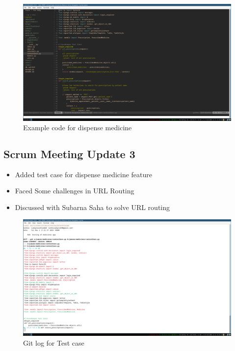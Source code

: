 \documentclass[a4paper,12pt]{article}
\begin{document}
\begin{figure}[H]
    \centering
    \includegraphics[width=1\textwidth]{images/scr2examplecode3.png}
    \caption{Example code for dispense medicine}
    \label{fig:scr2code3}
\end{figure}


\subsection{Scrum Meeting Update 3}
\begin{itemize}
    \item Added test case for dispense medicine feature
    \item Faced Some challenges in URL Routing
    \item Discussed with Subarna Saha to solve URL routing
\end{itemize}

\begin{figure}[H]
    \centering
    \includegraphics[width=1\textwidth]{images/scr2git4.png}
    \caption{Git log for Test case}
    \label{fig:gitlogscr24}
\end{figure}
\end{document}

